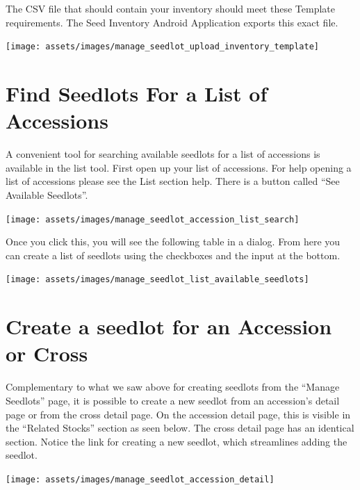 \documentclass[
  12pt,
]{book}
\begin{document}
The CSV file that should contain your inventory should meet these Template requirements. The Seed Inventory Android Application exports this exact file.

\begin{center}\texttt{[image: assets/images/manage\_seedlot\_upload\_inventory\_template]} \end{center}

\hypertarget{find-seedlots-for-a-list-of-accessions}{%
\section{Find Seedlots For a List of Accessions}\label{find-seedlots-for-a-list-of-accessions}}

A convenient tool for searching available seedlots for a list of accessions is available in the list tool. First open up your list of accessions. For help opening a list of accessions please see the List section help. There is a button called ``See Available Seedlots''.

\begin{center}\texttt{[image: assets/images/manage\_seedlot\_accession\_list\_search]} \end{center}

Once you click this, you will see the following table in a dialog. From here you can create a list of seedlots using the checkboxes and the input at the bottom.

\begin{center}\texttt{[image: assets/images/manage\_seedlot\_list\_available\_seedlots]} \end{center}

\hypertarget{create-a-seedlot-for-an-accession-or-cross}{%
\section{Create a seedlot for an Accession or Cross}\label{create-a-seedlot-for-an-accession-or-cross}}

Complementary to what we saw above for creating seedlots from the ``Manage Seedlots'' page, it is possible to create a new seedlot from an accession's detail page or from the cross detail page. On the accession detail page, this is visible in the ``Related Stocks'' section as seen below. The cross detail page has an identical section. Notice the link for creating a new seedlot, which streamlines adding the seedlot.

\begin{center}\texttt{[image: assets/images/manage\_seedlot\_accession\_detail]} \end{center}
\end{document}
